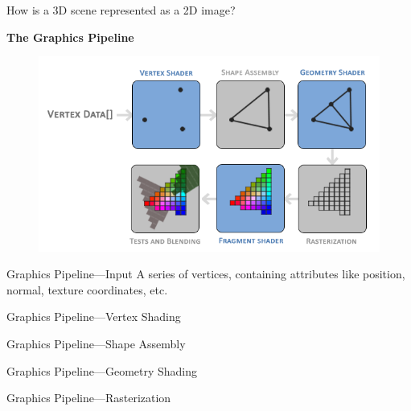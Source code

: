 \documentclass[10pt]{beamer}
\begin{document}
\begin{frame}{How is a 3D scene represented as a 2D image?}
  \begin{center}
    \huge\textbf{The Graphics Pipeline}
  \end{center}

  \begin{figure}
    \includegraphics[width=\textwidth]{learnopengl_graphicspipeline.png}
  \end{figure}
\end{frame}

\begin{frame}{Graphics Pipeline---Input}
  A series of vertices, containing attributes like position, normal, texture coordinates, etc.
\end{frame}

\begin{frame}{Graphics Pipeline---Vertex Shading}

\end{frame}

\begin{frame}{Graphics Pipeline---Shape Assembly}

\end{frame}

\begin{frame}{Graphics Pipeline---Geometry Shading}

\end{frame}

\begin{frame}{Graphics Pipeline---Rasterization}

\end{frame}
\end{document}
